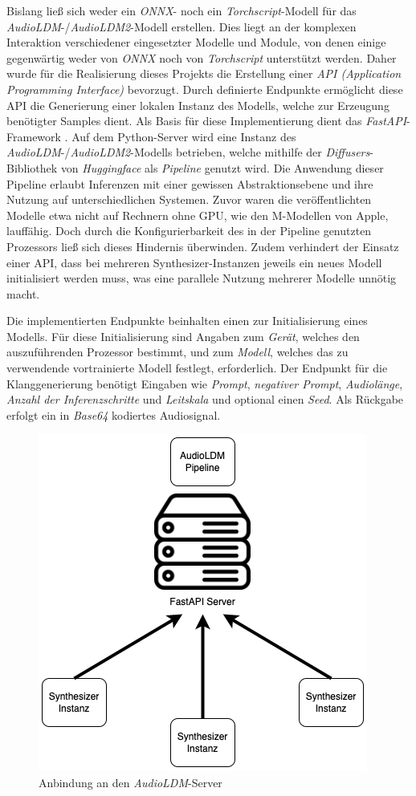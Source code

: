 \documentclass[
  a4paper,  %
  twoside,  %
  bibliography=totoc,
  headsepline,
  cleardoublepage=empty,
  parskip=half,
  draft=false
]{scrbook}
\begin{document}
Bislang ließ sich weder ein \emph{ONNX}- noch ein \emph{Torchscript}-Modell für das \emph{AudioLDM}-/\emph{AudioLDM2}-Modell erstellen. Dies liegt an der komplexen Interaktion verschiedener eingesetzter Modelle und Module, von denen einige gegenwärtig weder von \emph{ONNX} noch von \emph{Torchscript} unterstützt werden. Daher wurde für die Realisierung dieses Projekts die Erstellung einer \emph{API (Application Programming Interface)} bevorzugt. Durch definierte Endpunkte ermöglicht diese API die Generierung einer lokalen Instanz des Modells, welche zur Erzeugung benötigter Samples dient. Als Basis für diese Implementierung dient das \emph{FastAPI}-Framework \cite{noauthor_fastapi_nodate}. Auf dem Python-Server wird eine Instanz des \emph{AudioLDM}-/\emph{AudioLDM2}-Modells betrieben, welche mithilfe der \emph{Diffusers}-Bibliothek \cite{von_platen_diffusers_2023} von \emph{Huggingface} \cite{noauthor_hugging_2023} als \emph{Pipeline} \cite{noauthor_huggingface-audioldm_nodate, noauthor_huggingface-audioldm2_nodate} genutzt wird. Die Anwendung dieser Pipeline erlaubt Inferenzen mit einer gewissen Abstraktionsebene und ihre Nutzung auf unterschiedlichen Systemen. Zuvor waren die veröffentlichten Modelle etwa nicht auf Rechnern ohne GPU, wie den M-Modellen von Apple, lauffähig. Doch durch die Konfigurierbarkeit des in der Pipeline genutzten Prozessors ließ sich dieses Hindernis überwinden. Zudem verhindert der Einsatz einer API, dass bei mehreren Synthesizer-Instanzen jeweils ein neues Modell initialisiert werden muss, was eine parallele Nutzung mehrerer Modelle unnötig macht.

Die implementierten Endpunkte beinhalten einen zur Initialisierung eines Modells. Für diese Initialisierung sind Angaben zum \emph{Gerät}, welches den auszuführenden Prozessor bestimmt, und zum \emph{Modell}, welches das zu verwendende vortrainierte Modell festlegt, erforderlich. Der Endpunkt für die Klanggenerierung benötigt Eingaben wie \emph{Prompt}, \emph{negativer Prompt}, \emph{Audiolänge}, \emph{Anzahl der Inferenzschritte} und \emph{Leitskala} und optional einen \emph{Seed}. Als Rückgabe erfolgt ein in \emph{Base64} kodiertes Audiosignal.

\begin{figure}
  \centering
  \includegraphics[width=.4\textwidth]{graphics/Server.png}
  \caption[AudiLDM Anbindung]{Anbindung an den \emph{AudioLDM}-Server}
  \label{fig:server}
\end{figure}
\end{document}
